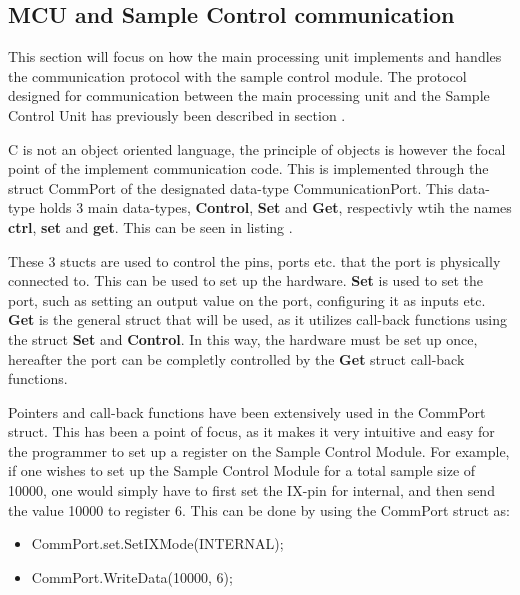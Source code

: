 \subsection{MCU and Sample Control communication} \label{subsec:MCUSCCommunication} 
This section will focus on how the main processing unit implements and handles the communication protocol with the sample control module. 
The protocol designed for communication between the main processing unit and the Sample Control Unit has previously been described in section .

C is not an object oriented language, the principle of objects is however the focal point of the implement communication code. This is implemented through the struct CommPort of the designated data-type CommunicationPort. This data-type holds 3 main data-types, \textbf{Control}, \textbf{Set} and \textbf{Get}, respectivly wtih the names \textbf{ctrl}, \textbf{set} and \textbf{get}. This can be seen in listing .



These 3 stucts are used to control the pins, ports etc. that the port is physically connected to. This can be used to set up the hardware. \textbf{Set} is used to set the port, such as setting an output value on the port, configuring it as inputs etc. \textbf{Get} is the general struct that will be used, as it utilizes call-back functions using the struct \textbf{Set} and \textbf{Control}. In this way, the hardware must be set up once, hereafter the port can be completly controlled by the \textbf{Get} struct call-back functions. 

Pointers and call-back functions have been extensively used in the CommPort struct. This has been a point of focus, as it makes it very intuitive and easy for the programmer to set up a register on the Sample Control Module. For example, if one wishes to set up the Sample Control Module for a total sample size of 10000, one would simply have to first set the IX-pin for internal, and then send the value 10000 to register 6. This can be done by using the CommPort struct as:

\begin{itemize}
    \item CommPort.set.SetIXMode(INTERNAL);
    \item CommPort.WriteData(10000, 6);
\end{itemize}

